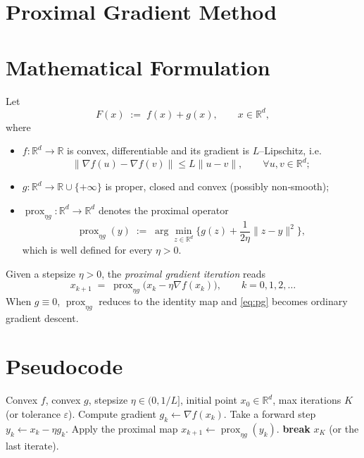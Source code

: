 \documentclass{article}
\newcommand{\prox}{\operatorname{prox}}
\newcommand{\R}{\mathbb{R}}
\begin{document}
\section*{Proximal Gradient Method}

\section*{Mathematical Formulation}
Let 
\[
F(x)\;:=\;f(x)+g(x),\qquad x\in\R^{d},
\]
where  

\begin{itemize}
    \item $f:\R^{d}\to\R$ is convex, differentiable and its gradient is $L$–Lipschitz, i.e.
    \[
        \|\nabla f(u)-\nabla f(v)\|\le L\|u-v\|,\qquad\forall u,v\in\R^{d};
    \]
    \item $g:\R^{d}\to\R\cup\{+\infty\}$ is proper, closed and convex (possibly non‑smooth);
    \item $\prox_{\eta g}:\R^{d}\to\R^{d}$ denotes the proximal operator
    \[
        \prox_{\eta g}(y)\;:=\;\arg\min_{z\in\R^{d}}\Big\{ g(z)+\frac{1}{2\eta}\|z-y\|^{2}\Big\},
    \]
    which is well defined for every $\eta>0$.
\end{itemize}

Given a stepsize $\eta>0$, the \emph{proximal gradient iteration} reads
\begin{equation}
\label{eq:pg}
x_{k+1}\;=\;\prox_{\eta g}\bigl(x_{k}-\eta\nabla f(x_{k})\bigr),\qquad k=0,1,2,\dots
\end{equation}
When $g\equiv0$, $\prox_{\eta g}$ reduces to the identity map and \eqref{eq:pg} becomes ordinary gradient descent.

\section*{Pseudocode}
\begin{algorithm}[H]
\caption{Proximal Gradient Method}
\begin{algorithmic}[1]
\Require Convex $f$, convex $g$, stepsize $\eta\in(0,1/L]$, initial point $x_{0}\in\R^{d}$, max iterations $K$ (or tolerance $\varepsilon$).
    \State Compute gradient $g_{k}\gets \nabla f(x_{k})$.
    \State Take a forward step $y_{k}\gets x_{k}-\eta g_{k}$.
    \State Apply the proximal map $x_{k+1}\gets \prox_{\eta g}(y_{k})$.
        \State \textbf{break}
    \EndIf
\EndFor
\State \Return $x_{K}$ (or the last iterate).
\end{algorithmic}
\end{algorithm}
\end{document}
